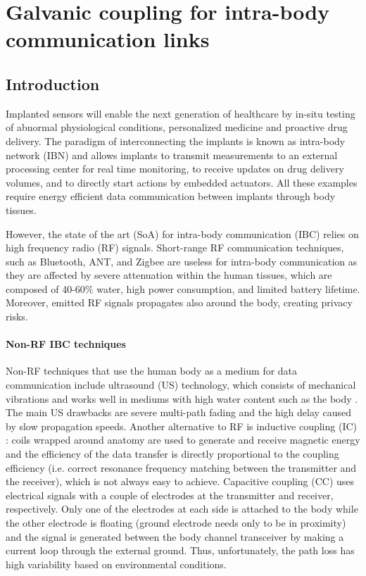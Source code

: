 \chapter{Galvanic coupling for intra-body communication links} 
\section{Introduction}
Implanted sensors will enable the next generation of healthcare by in-situ testing of abnormal physiological conditions, personalized medicine and proactive drug delivery. 
The paradigm of interconnecting the implants is known as intra-body network (IBN) 
and allows implants to transmit measurements to an external processing center for real time monitoring, to receive updates on drug delivery volumes, and to directly start actions by embedded actuators. 
All these examples require energy efficient data communication between implants through body tissues.

However, the state of the art (SoA) for intra-body communication (IBC) relies on high frequency radio (RF) signals. Short-range RF communication techniques, such as Bluetooth, ANT, and Zigbee \cite{Seyedi2013} are useless for intra-body communication as they are affected by severe attenuation  within the human tissues, which are composed of 40-60$\%$ water, high power consumption, and limited battery lifetime.
Moreover, emitted RF signals propagates also around the body, creating privacy risks.  

\subsubsection{Non-RF IBC techniques}
Non-RF techniques that use the human body as a medium for data communication include ultrasound (US) technology, which consists of mechanical vibrations and works well in mediums with high water content such as the body \cite{Galluccio2012}. The main US drawbacks are severe multi-path fading and the high delay caused by slow propagation speeds. Another alternative to RF is inductive coupling (IC) \cite{Park2015}: coils wrapped around anatomy are used to generate and receive magnetic energy and the efficiency of the data transfer is directly proportional to the coupling efficiency (i.e. correct resonance frequency matching between the transmitter and the receiver), which is not always easy to achieve. Capacitive coupling (CC) \cite{Seyedi2013} uses electrical signals with a couple of electrodes at the transmitter and receiver, respectively. Only one of the electrodes at each side is attached to the body while the other electrode is floating (ground electrode needs only to be in proximity) and the signal is generated between the body channel transceiver by making a current loop through the external ground. Thus, unfortunately, the path loss has high variability based on environmental conditions.

